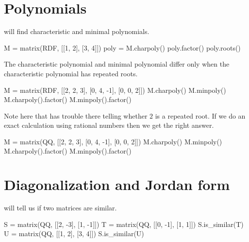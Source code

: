 



\section{Polynomials}

\Sage{} will find characteristic and minimal polynomials.
\begin{sageoutput}
M =  matrix(RDF, [[1, 2], [3, 4]]) 
poly = M.charpoly()
poly.factor()
poly.roots()
\end{sageoutput}

The characteristic polynomial and minimal polynomial differ only when 
the characteristic polynomial has repeated roots.
\begin{sageoutput}
M =  matrix(RDF, [[2, 2, 3], [0, 4, -1], [0, 0, 2]]) 
M.charpoly()
M.minpoly()
M.charpoly().factor()
M.minpoly().factor()
\end{sageoutput}
\noindent
Note here that \Sage{} has trouble there telling whether $2$ is a repeated 
root.
If we do an exact calculation using 
rational numbers then we get the right answer.  
\begin{sageoutput}
M =  matrix(QQ, [[2, 2, 3], [0, 4, -1], [0, 0, 2]]) 
M.charpoly()
M.minpoly()
M.charpoly().factor()
M.minpoly().factor()
\end{sageoutput}




\section{Diagonalization and Jordan form}

\Sage{} will tell us if two matrices are similar.
\begin{sageoutput}
S =  matrix(QQ, [[2, -3], [1, -1]]) 
T =  matrix(QQ, [[0, -1], [1,  1]]) 
S.is_similar(T)
U =  matrix(QQ, [[1, 2], [3,  4]]) 
S.is_similar(U)
\end{sageoutput}
\noindent

